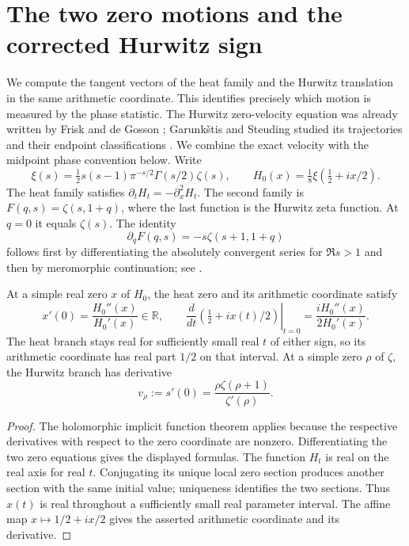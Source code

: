 \section{The two zero motions and the corrected Hurwitz sign}
\label{sec:motion-local}

We compute the tangent vectors of the heat family and the Hurwitz translation in the same arithmetic coordinate. This identifies precisely which motion is measured by the phase statistic. The Hurwitz zero-velocity equation was already written by Frisk and de Gosson \cite[Section~2, equation~(3)]{frisk-degosson}; Garunk\v stis and Steuding studied its trajectories and their endpoint classifications \cite[Section~2]{garunkstis-steuding}. We combine the exact velocity with the midpoint phase convention below.
Write
\[
 \xi(s)=\tfrac12s(s-1)\pi^{-s/2}\Gamma(s/2)\zeta(s),
 \qquad H_0(x)=\tfrac18\xi(\tfrac12+ix/2).
\]
The heat family satisfies $\partial_tH_t=-\partial_x^2H_t$.
The second family is $F(q,s)=\zeta(s,1+q)$, where the last function is the Hurwitz zeta function. At $q=0$ it equals $\zeta(s)$. The identity
\[
 \partial_qF(q,s)=-s\zeta(s+1,1+q)
\]
follows first by differentiating the absolutely convergent series for $\Re s>1$ and then by meromorphic continuation; see \cite[25.11.17]{dlmf}.

\begin{proposition}\label{prop:two-tangents}
At a simple real zero $x$ of $H_0$, the heat zero and its arithmetic coordinate satisfy
\[
 x'(0)=\frac{H_0''(x)}{H_0'(x)}\in\mathbb R,
 \qquad
 \left.\frac{d}{dt}\left(\tfrac12+ix(t)/2\right)\right|_{t=0}
       =\frac{iH_0''(x)}{2H_0'(x)}.
\]
The heat branch stays real for sufficiently small real $t$ of either sign, so its arithmetic coordinate has real part $1/2$ on that interval.
At a simple zero $\rho$ of $\zeta$, the Hurwitz branch has derivative
\[
 v_\rho:=s'(0)=\frac{\rho\zeta(\rho+1)}{\zeta'(\rho)}.
\]
\end{proposition}
\begin{proof}
The holomorphic implicit function theorem applies because the respective derivatives with respect to the zero coordinate are nonzero. Differentiating the two zero equations gives the displayed formulas. The function $H_t$ is real on the real axis for real $t$. Conjugating its unique local zero section produces another section with the same initial value; uniqueness identifies the two sections. Thus $x(t)$ is real throughout a sufficiently small real parameter interval. The affine map $x\mapsto1/2+ix/2$ gives the asserted arithmetic coordinate and its derivative.
\end{proof}

